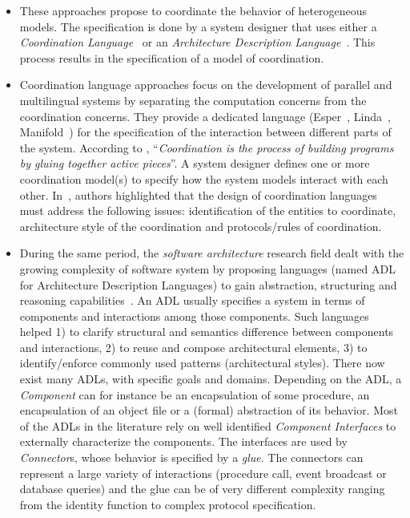 \begin{itemize}
		    \item These approaches propose to coordinate the behavior of heterogeneous models. The specification is done by a system designer that uses either a \emph{Coordination Language}~\cite{coordmodels} or an \emph{Architecture Description Language}~\cite{frameadlsbib}. This process results in the specification of a model of coordination. 
			 
			\item Coordination language approaches focus on the development of parallel and multilingual systems by separating the computation concerns from the coordination concerns. They provide a dedicated language (\eg Esper~\cite{esperbib}, Linda~\cite{lindabib}, Manifold~\cite{manifoldbib}) for the specification of the interaction between different parts of the system. According to \cite{coordsignibib}, ``\textit{Coordination is the process of building programs by gluing together active pieces}''. A system designer defines one or more coordination model(s) to specify how the system models interact with each other. In~\cite{wegnercoorbib}, authors highlighted that the design of coordination languages must address the following issues: identification of the entities to coordinate, architecture style of the coordination and protocols/rules of coordination.
			 
			\item During the same period, the \emph{software architecture} research field dealt with the growing complexity of software system by proposing languages (named ADL for Architecture Description Languages) to gain abstraction, structuring and reasoning capabilities~\cite{rapidebib,wrightbib,uniconbib,frameadlsbib,garlansoftarchbib}. An ADL usually specifies a system in terms of components and interactions among those components. Such languages helped 1) to clarify structural and semantics difference between components and interactions, 2) to reuse and compose architectural elements, 3) to identify/enforce commonly used patterns (\eg architectural styles). There now exist many ADLs, with specific goals and domains. Depending on the ADL, a \emph{Component} can for instance be an encapsulation of some procedure, an encapsulation of an object file or a (formal) abstraction of its behavior. Most of the ADLs in the literature rely on well identified \emph{Component Interfaces} to externally characterize the components. The interfaces are used by \emph{Connector}s, whose behavior is specified by a \emph{glue}. The connectors can represent a large variety of interactions (\eg procedure call, event broadcast or database queries) and the glue can be of very different complexity ranging from the identity function to complex protocol specification. 
			 

\end{itemize}
